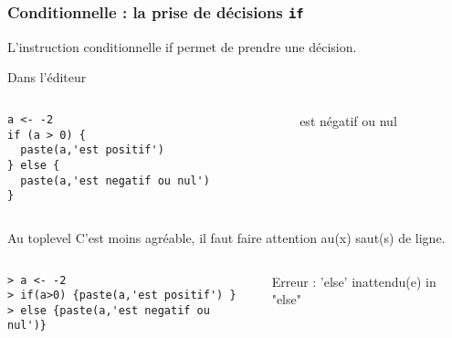 \documentclass[10pt]{beamer}
\begin{document}
\begin{frame}[fragile]
  \frametitle{Conditionnelle : la prise de décisions \texttt{if}}
  \alert{L'instruction conditionnelle if permet de prendre une décision.}

  \begin{block}{Dans l'éditeur}
    \begin{columns}[c]
      \begin{column}{0.53\textwidth}
  \begin{lstlisting}[style=editor]
a <- -2
if (a > 0) {
  paste(a,'est positif')
} else {
  paste(a,'est negatif ou nul')
}    
\end{lstlisting}

\end{column}
\begin{column}{0.47\textwidth}
   est négatif ou nul
\end{column}
\end{columns} 
  \end{block}
  


\begin{block}{Au toplevel}
  C'est moins agréable, il faut faire attention au(x) saut(s) de ligne.
\end{block}
\begin{columns}[c]
\begin{column}{0.65\textwidth}
  \begin{lstlisting}
> a <- -2
> if(a>0) {paste(a,'est positif') }
> else {paste(a,'est negatif ou nul')}
  \end{lstlisting}
\end{column}
\begin{column}{0.35\textwidth}
  \RUN 
  \alert{Erreur : 'else' inattendu(e) in "else"}
\end{column}
\end{columns}
\end{frame}
\end{document}
